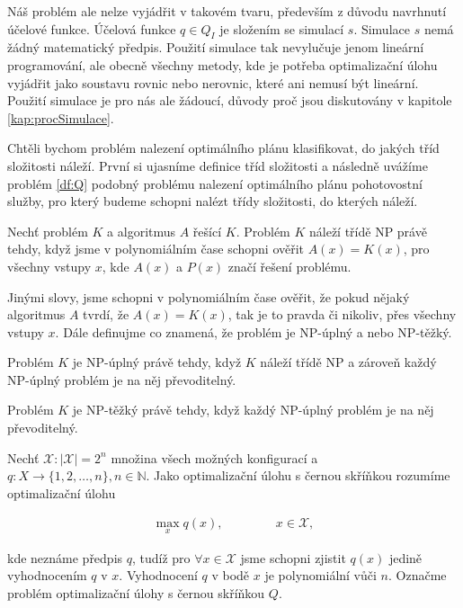 Náš problém ale nelze vyjádřit v takovém tvaru, především z důvodu navrhnutí účelové funkce.
Účelová funkce $q \in Q_I$ je složením se simulací $s$. Simulace $s$ nemá žádný matematický předpis.
Použití simulace tak nevylučuje jenom lineární programování, ale obecně všechny metody, kde je potřeba optimalizační úlohu vyjádřit jako
soustavu rovnic nebo nerovnic, které ani nemusí být lineární.
Použití simulace je pro nás ale žádoucí, důvody proč jsou diskutovány v kapitole \ref{kap:procSimulace}.

Chtěli bychom problém nalezení optimálního plánu klasifikovat, do jakých tříd složitosti náleží.
První si ujasníme definice tříd složitosti a následně uvážíme problém \ref{df:Q} podobný problému nalezení optimálního plánu pohotovostní služby,
pro který budeme schopni nalézt třídy složitosti, do kterých náleží.

\begin{definice}\label{df:NP}
  Nechť problém $K$ a algoritmus $A$ řešící $K$.
  Problém $K$ náleží třídě NP právě tehdy, když jsme v polynomiálním čase schopni ověřit
  $A(x) = K(x)$, pro všechny vstupy $x$, kde $A(x)$ a $P(x)$ značí řešení problému.
\end{definice}

Jinými slovy, jsme schopni v polynomiálním čase ověřit, že pokud nějaký algoritmus $A$ tvrdí, že $A(x) = K(x)$, tak je to pravda či nikoliv, přes všechny vstupy $x$.
Dále definujme co znamená, že problém je NP-úplný a nebo NP-těžký.

\begin{definice}\label{df:NPup}
  Problém $K$ je NP-úplný právě tehdy, když $K$ náleží třídě NP a zároveň každý NP-úplný problém je na něj převoditelný.
\end{definice}

\begin{definice}\label{df:NPhard}
  Problém $K$ je NP-těžký právě tehdy, když každý NP-úplný problém je na něj převoditelný.
\end{definice}

\begin{definice}\label{df:Q}
  Nechť $\mathcal{X} \colon |\mathcal{X}| = 2^n$ množina všech možných konfigurací a $q \colon X \rightarrow \{ 1, 2, \dots, n \}, n \in \mathbb{N}$.
  Jako optimalizační úlohu s černou skříňkou rozumíme optimalizační úlohu

  \begin{align*}
    \max_{x} q(x), \hspace{50pt} x \in \mathcal{X},
  \end{align*}

  kde neznáme předpis $q$, tudíž pro $\forall x \in \mathcal{X}$ jsme schopni zjistit $q(x)$ jedině vyhodnocením $q$ v $x$.
  Vyhodnocení $q$ v bodě $x$ je polynomiální vůči $n$. Označme problém optimalizační úlohy s černou skříňkou $Q$.
\end{definice}

